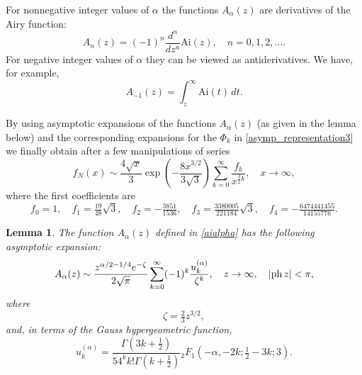 \documentclass[11pt]{article}
\newtheorem{lemma}{Lemma}[section]
\begin{document}
For nonnegative integer values of ${\alpha}$ the functions $A_{\alpha}(z)$ are derivatives of the Airy function:
$$
A_n(z) =(-1)^n\frac{d^n}{dz^n}{\mbox{Ai}}(z),\quad n=0,1,2,\ldots.
$$
For negative integer  values of ${\alpha}$ they can be viewed as antiderivatives. We have, for example,
$$
A_{-1}(z) =\int_z^\infty {\mbox{Ai}}(t)\,dt.
$$

By using asymptotic expansions of the functions $A_{\alpha}(z)$ (as given in the lemma below) and the corresponding expansions for the $\Phi_k$ in \eqref{asymp_representation3} we finally obtain after a few manipulations of series
\begin{equation}
\label{fNxasymp}
f_N(x)\sim\frac{4\sqrt{x}}{3}\exp\left(-\frac{8x^{3/2}}{3\sqrt{3}}\right)\sum_{k=0}^\infty \frac{f_k}{x^{\frac32k}},\quad x\to\infty,
\end{equation}
where the first coefficients are
$$
f_0=  1,\quad 
f_1=  \tfrac{19}{48}\sqrt{3},
\quad 
f_2=  -\tfrac{3851}{1536},\quad 
f_3=   \tfrac{3380005}{221184}\sqrt{3},\quad
f_4=-\tfrac{6474441455}{14155776}.
$$

\begin{lemma}
\label{Aa}
The function  $A_{\alpha}(z)$ defined in \eqref{aialpha} has the following asymptotic expansion:
\begin{equation}
\label{Aalasymp}
A_{\alpha}(z)\sim\frac{z^{{\alpha}/2-1/4}e^{{-\zeta}}}{2\sqrt{\pi}}
\sum _{{k=0}}^{{\infty}}(-1)^{k}\frac{u_{k}^{({\alpha})}}{\zeta^{k}},
\quad z\to\infty, 
\quad \vert{{\rm ph}}\,z\vert<\pi, 
\end{equation}
where 
$$
\zeta=\tfrac23z^{3/2},
$$
and, in terms of the Gauss hypergeometric function,
\begin{equation}
\label{uk}
u_{k}^{({\alpha})}=\frac{\Gamma(3k+\frac12)}{54^{k}k!\Gamma(k+\frac12)}{}_2F_1\left(-{\alpha},-2k;\tfrac12-3k;3\right).
\end{equation}
\end{lemma}
\end{document}
